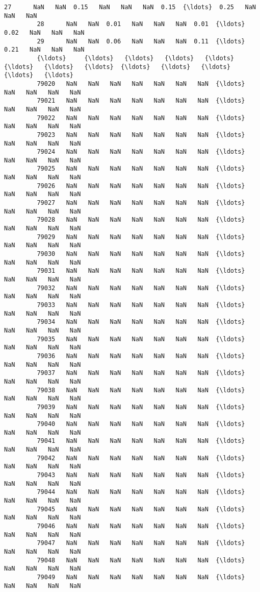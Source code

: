 \documentclass[11pt]{article}
\begin{document}
\begin{Verbatim}[commandchars=\\\{\}]
         27      NaN   NaN  0.15   NaN   NaN   NaN  0.15  {\ldots}  0.25   NaN   NaN   NaN   
         28      NaN   NaN  0.01   NaN   NaN   NaN  0.01  {\ldots}  0.02   NaN   NaN   NaN   
         29      NaN   NaN  0.06   NaN   NaN   NaN  0.11  {\ldots}  0.21   NaN   NaN   NaN   
         {\ldots}     {\ldots}   {\ldots}   {\ldots}   {\ldots}   {\ldots}   {\ldots}   {\ldots}  {\ldots}   {\ldots}   {\ldots}   {\ldots}   {\ldots}   
         79020   NaN   NaN   NaN   NaN   NaN   NaN   NaN  {\ldots}   NaN   NaN   NaN   NaN   
         79021   NaN   NaN   NaN   NaN   NaN   NaN   NaN  {\ldots}   NaN   NaN   NaN   NaN   
         79022   NaN   NaN   NaN   NaN   NaN   NaN   NaN  {\ldots}   NaN   NaN   NaN   NaN   
         79023   NaN   NaN   NaN   NaN   NaN   NaN   NaN  {\ldots}   NaN   NaN   NaN   NaN   
         79024   NaN   NaN   NaN   NaN   NaN   NaN   NaN  {\ldots}   NaN   NaN   NaN   NaN   
         79025   NaN   NaN   NaN   NaN   NaN   NaN   NaN  {\ldots}   NaN   NaN   NaN   NaN   
         79026   NaN   NaN   NaN   NaN   NaN   NaN   NaN  {\ldots}   NaN   NaN   NaN   NaN   
         79027   NaN   NaN   NaN   NaN   NaN   NaN   NaN  {\ldots}   NaN   NaN   NaN   NaN   
         79028   NaN   NaN   NaN   NaN   NaN   NaN   NaN  {\ldots}   NaN   NaN   NaN   NaN   
         79029   NaN   NaN   NaN   NaN   NaN   NaN   NaN  {\ldots}   NaN   NaN   NaN   NaN   
         79030   NaN   NaN   NaN   NaN   NaN   NaN   NaN  {\ldots}   NaN   NaN   NaN   NaN   
         79031   NaN   NaN   NaN   NaN   NaN   NaN   NaN  {\ldots}   NaN   NaN   NaN   NaN   
         79032   NaN   NaN   NaN   NaN   NaN   NaN   NaN  {\ldots}   NaN   NaN   NaN   NaN   
         79033   NaN   NaN   NaN   NaN   NaN   NaN   NaN  {\ldots}   NaN   NaN   NaN   NaN   
         79034   NaN   NaN   NaN   NaN   NaN   NaN   NaN  {\ldots}   NaN   NaN   NaN   NaN   
         79035   NaN   NaN   NaN   NaN   NaN   NaN   NaN  {\ldots}   NaN   NaN   NaN   NaN   
         79036   NaN   NaN   NaN   NaN   NaN   NaN   NaN  {\ldots}   NaN   NaN   NaN   NaN   
         79037   NaN   NaN   NaN   NaN   NaN   NaN   NaN  {\ldots}   NaN   NaN   NaN   NaN   
         79038   NaN   NaN   NaN   NaN   NaN   NaN   NaN  {\ldots}   NaN   NaN   NaN   NaN   
         79039   NaN   NaN   NaN   NaN   NaN   NaN   NaN  {\ldots}   NaN   NaN   NaN   NaN   
         79040   NaN   NaN   NaN   NaN   NaN   NaN   NaN  {\ldots}   NaN   NaN   NaN   NaN   
         79041   NaN   NaN   NaN   NaN   NaN   NaN   NaN  {\ldots}   NaN   NaN   NaN   NaN   
         79042   NaN   NaN   NaN   NaN   NaN   NaN   NaN  {\ldots}   NaN   NaN   NaN   NaN   
         79043   NaN   NaN   NaN   NaN   NaN   NaN   NaN  {\ldots}   NaN   NaN   NaN   NaN   
         79044   NaN   NaN   NaN   NaN   NaN   NaN   NaN  {\ldots}   NaN   NaN   NaN   NaN   
         79045   NaN   NaN   NaN   NaN   NaN   NaN   NaN  {\ldots}   NaN   NaN   NaN   NaN   
         79046   NaN   NaN   NaN   NaN   NaN   NaN   NaN  {\ldots}   NaN   NaN   NaN   NaN   
         79047   NaN   NaN   NaN   NaN   NaN   NaN   NaN  {\ldots}   NaN   NaN   NaN   NaN   
         79048   NaN   NaN   NaN   NaN   NaN   NaN   NaN  {\ldots}   NaN   NaN   NaN   NaN   
         79049   NaN   NaN   NaN   NaN   NaN   NaN   NaN  {\ldots}   NaN   NaN   NaN   NaN   
         

\end{Verbatim}
\end{document}
